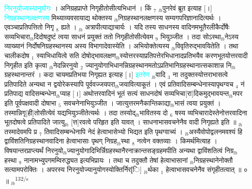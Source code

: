 \documentclass[article,12pt,a4paper]{memoir}%
\newcommand{\quotelemma}[1]{\textcolor{cyan}{#1}}
\newcounter{parCount}
\begin{document}
	  
	  \pstart \leavevmode%
	\hphantom{.}\quotelemma{निरनुयोज्यस्यानुयोगः} \cite[19a6]{vn-msN} । अनिग्रहप्राप्ते निगृहीतोसीत्यभिधानं । किं {\tiny $_{7}$} {\tiny $_{lb}$}पुनरेवं ब्रूत इत्याह [।] \quotelemma{निग्रहस्थानलक्षणस्य} मिथ्याव्यवसायाद्य \cite[19a6]{vn-msN} थोक्तस्य {\tiny $_{lb}$}निग्रहस्थानलक्षणस्य सम्यगपरिज्ञानादित्यर्थः । एवञ्चाप्रतिपत्तितो निगृ {\tiny $_{8}$} ह्यते । {\tiny $_{lb}$} \leavevmode{} अत्रापीत्याद्याचार्यः । यदि तस्य साधनस्य वादिनमभूतैरलीकैर्दोषैः सव्यभिचारा{\tiny $_{lb}$}दिदोषदुष्टं त्वया साधनं प्रयुक्तं ततो निगृहीतोसीत्येवम {\tiny $_{9}$} भियुञ्जीत । तदा सोऽस्था{\tiny $_{lb}$}नेऽस्य व्याख्यानं निर्दोषनिग्रहस्थानस्य अस्य विभागादेवास्येति । अभियोक्तेत्यस्य {\tiny $_{lb}$}विवृतिरुद्भावयितेति । तथा चालीकदोष {\tiny $_{1}$} स्याभिधायित्वे सति दोषोद्भावलक्षण{\tiny $_{lb}$}स्योत्तरस्याप्रतिपत्तेरभिधानादप्रतिभयैव करणभूतयोत्तरवादी निगृहीत इति कृत्वा {\tiny $_{lb}$}नेदन्निरनुयो {\tiny $_{2}$} ज्यानुयोगाभिधानन्निग्रहस्थानमतोऽप्रतिभानिग्रहस्थानात्सकाशान्न नि{\tiny $_{lb}$}ग्रहस्थानान्तरं । कदा चायमप्रतिभया निगृह्यत इत्याह [।] \quotelemma{इतरेण} \cite[19a8]{vn-msN} {\tiny $_{lb}$}वादि {\tiny $_{3}$} ना तदुक्तस्योत्तराभासत्वे प्रतिपादिते अन्यथा न द्वयोरेकस्यापि पूर्ववज्जयपरा{\tiny $_{lb}$}जयावित्याकूतं । एवं प्रतिवादिसम्बन्धेनास्यापृथग्वच {\tiny $_{4}$} नं प्रतिपाद्य वादिसम्बन्धेना{\tiny $_{lb}$}प्याह [।] अथोत्तरवादिनं भूतं सत्यं साधनदोषं सव्यभिचा[रा]दिकमुद्भावयन्त{\tiny $_{lb}$}मपर इति पूर्वपक्षवादी दोषाभा {\tiny $_{5}$} सवचनेनाभियुञ्जीत । जात्युत्तरमनैकान्तिकाद्या{\tiny $_{lb}$}भासं त्वया प्रयुक्तं । तस्मान्निगृ[ही]तोसीत्येवं यद्यभियुञ्जीतेत्यर्थः । तदा तस्योद्{\tiny $_{lb}$}भावितस्य दो {\tiny $_{6}$} षस्य व्यभिचारादेस्तेनोत्तरवादिना भूतदोषत्वे प्रतिपादिते जात्यु{\tiny $_{lb}$} [त्त]रवत्वे परिहृत इति यावत् । साधनाभासवचनेनैव वादी निगृह्यते इति ॥ {\tiny $_{lb}$}तस्मादेवमपि प्र {\tiny $_{7}$} तिवादिसम्बन्धेनापि नेदं हेत्वाभासेभ्यो भिद्यत इति पृथग्वाच्यं । {\tiny $_{lb}$}अस्यैवोपोद्वलनमवश्यं हि द्वाविंशतिनिग्रहस्थानवादिना हेत्वाभासाः पृथग् निग्रह{\tiny $_{lb}$}स्था {\tiny $_{8}$} नत्वेन वक्तव्याः । किमर्थमित्याह । विषयान्तरप्राप्त्यर्थं \cite[19b1]{vn-msN} निरनुयो{\tiny $_{lb}$}ज्यानुयोगादिभिर्न्निग्रहस्थानैरनाक्रान्तसङ्ग्रहमपीति अन्यथा द्वाविंशतित्वं निग्र{\tiny $_{lb}$}हस्था {\tiny $_{9}$} \leavevmode{} नानामभ्युपगमम्विरुद्ध्यत इत्यभिप्रायः । तथा च तदुक्तौ तेषां हेत्वाभासानां {\tiny $_{lb}$}निग्रहस्थानेनोक्तौ सत्यामपरोक्तिः । अपरस्य निरनुयोज्यानुयोगस्योक्तिर्निर[ि] {\tiny $_{lb}$}र्थका {\tiny $_{1}$} हेत्वाभासवचनेनैव संगृहीतत्वात् ॥ ० ॥
	{}
	\pend%
      {\tiny $_{lb}$}\textsuperscript{\textenglish{132/s}}
\end{document}
